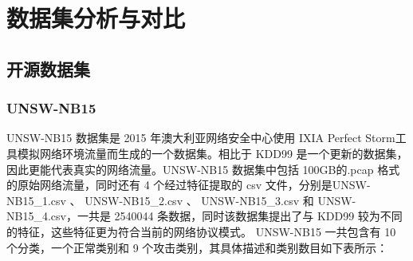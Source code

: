 
\chapter{数据集分析与对比}
\section{开源数据集}
\subsection{UNSW-NB15}
UNSW-NB15 数据集是 2015 年澳大利亚网络安全中心使用 IXIA Perfect Storm工具模拟网络环境流量而生成的一个数据集。相比于 KDD99 是一个更新的数据集，因此更能代表真实的网络流量。UNSW-NB15 数据集中包括 100GB的.pcap 格式的原始网络流量，同时还有 4 个经过特征提取的 csv 文件，分别是UNSW-NB15\_1.csv  、 UNSW-NB15\_2.csv 、 UNSW-NB15\_3.csv  和   UNSW-NB15\_4.csv，一共是 2540044 条数据，同时该数据集提出了与 KDD99 较为不同的特征，这些特征更为符合当前的网络协议模式。 UNSW-NB15 一共包含有 10 个分类，一个正常类别和 9 个攻击类别，其具体描述和类别数目如下表所示： 


